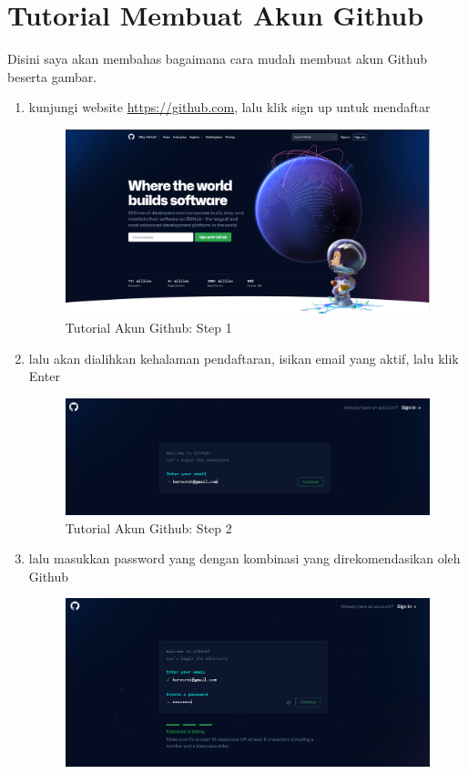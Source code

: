 \section{Tutorial Membuat Akun Github}
Disini saya akan membahas bagaimana cara mudah membuat akun Github beserta gambar.
\begin{enumerate}
\item kunjungi website \url{https://github.com}, lalu klik sign up untuk mendaftar
\begin{figure}[H]
        \centerline{\includegraphics[scale=0.25]{figures/buat-akun-github/step1}}
        \caption{Tutorial Akun Github: Step 1}
\end{figure}
\item lalu akan dialihkan kehalaman pendaftaran, isikan email yang aktif, lalu klik Enter
\begin{figure}[H]
        \centerline{\includegraphics[scale=0.35]{figures/buat-akun-github/step2}}
        \caption{Tutorial Akun Github: Step 2}
\end{figure}
\item lalu masukkan password yang dengan kombinasi yang direkomendasikan oleh Github
\begin{figure}[H]
        \centerline{\includegraphics[scale=0.35]{figures/buat-akun-github/step3}}

\end{figure}
\end{enumerate}
